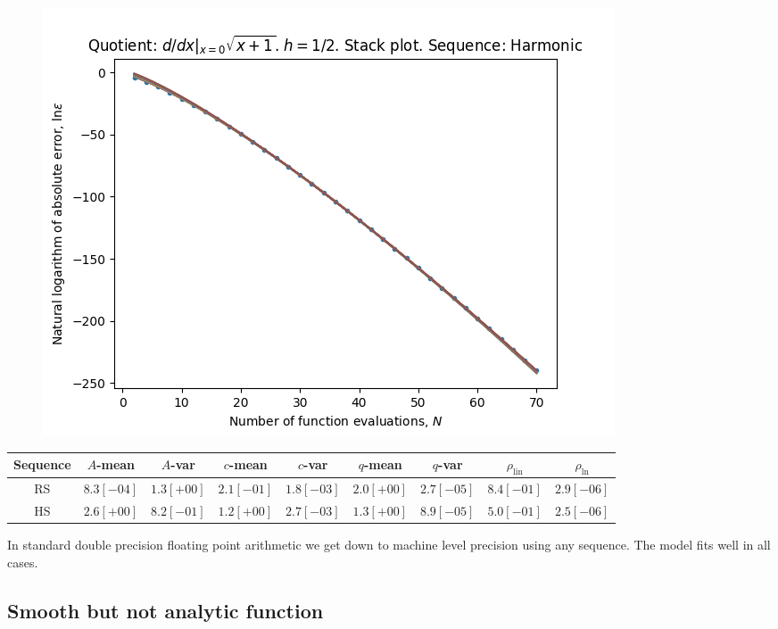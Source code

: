 \begin{figure}[H]
\centering
\begin{minipage}{0.45\textwidth}
\centering
\includegraphics[scale=0.45]{../results/diff_quot_plots/sqrt_1_hp_harmonic_stack.png}
\end{minipage}
\end{figure}

\begin{table}[H]
    \centering
    \small
    \begin{tabular}{c||c|c|c|c|c|c|c|c}
Sequence & \(A\)-mean & \(A\)-var & \(c\)-mean & \(c\)-var & \(q\)-mean & \(q\)-var & \(\rho_{\operatorname{lin}}\) & \(\rho_{\ln}\)\\\hline
\rowcolor{green}
RS & \(8.3[-04]\) & \(1.3[+00]\) & \(2.1[-01]\) & \(1.8[-03]\) & \(2.0[+00]\) & \(2.7[-05]\) & \(8.4[-01]\) & \(2.9[-06]\) \\
\rowcolor{green}
HS & \(2.6[+00]\) & \(8.2[-01]\) & \(1.2[+00]\) & \(2.7[-03]\) & \(1.3[+00]\) & \(8.9[-05]\) & \(5.0[-01]\) & \(2.5[-06]\) \\
    \end{tabular}
    \label{tab:my_label}
\end{table}

In standard double precision floating point arithmetic we get down to machine level precision using any sequence. The model fits well in all cases.

\subsection{Smooth but not analytic function}

